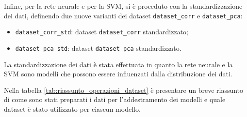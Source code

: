 Infine, per la rete neurale e per la SVM, si è proceduto con la standardizzazione
dei dati, definendo due nuove varianti dei dataset \texttt{dataset\_corr} e
\texttt{dataset\_pca}:
\begin{itemize}
      \item \texttt{dataset\_corr\_std}: dataset \texttt{dataset\_corr} standardizzato;
      \item \texttt{dataset\_pca\_std}: dataset \texttt{dataset\_pca} standardizzato.
\end{itemize}

La standardizzazione dei dati è stata effettuata in quanto la rete neurale e
la SVM sono modelli che possono essere influenzati dalla distribuzione dei dati.

Nella tabella \ref{tab:riassunto_operazioni_dataset} è presentare un breve
riassunto di come sono stati preparati i dati per l'addestramento dei modelli e
quale dataset è stato utilizzato per ciascun modello.

\begin{table}[ht!]
      \caption{Riassunto delle operazioni effettuate sui dataset e utilizzo dei dataset per i modelli.}
      \label{tab:riassunto_operazioni_dataset}
\end{table}